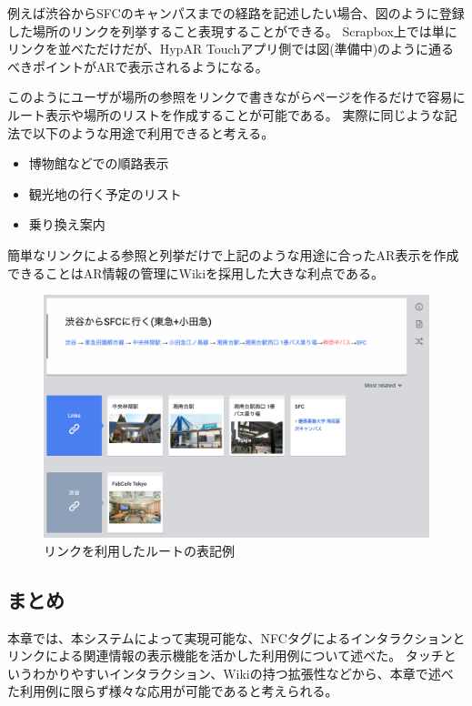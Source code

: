例えば渋谷からSFCのキャンパスまでの経路を記述したい場合、図のように登録した場所のリンクを列挙すること表現することができる。
Scrapbox上では単にリンクを並べただけだが、HypAR Touchアプリ側では図(準備中)のように通るべきポイントがARで表示されるようになる。

このようにユーザが場所の参照をリンクで書きながらページを作るだけで容易にルート表示や場所のリストを作成することが可能である。
実際に同じような記法で以下のような用途で利用できると考える。

\begin{itemize}
  \item 博物館などでの順路表示
  \item 観光地の行く予定のリスト
  \item 乗り換え案内
\end{itemize}

簡単なリンクによる参照と列挙だけで上記のような用途に合ったAR表示を作成できることはAR情報の管理にWikiを採用した大きな利点である。


\begin{figure}[h]
  \centering
  \includegraphics[width=150mm]{images/route_scrapbox.png}
  \caption{リンクを利用したルートの表記例} \label{fig:route_scrapbox}
\end{figure}


\subsection{まとめ}
本章では、本システムによって実現可能な、NFCタグによるインタラクションとリンクによる関連情報の表示機能を活かした利用例について述べた。
タッチというわかりやすいインタラクション、Wikiの持つ拡張性などから、本章で述べた利用例に限らず様々な応用が可能であると考えられる。
